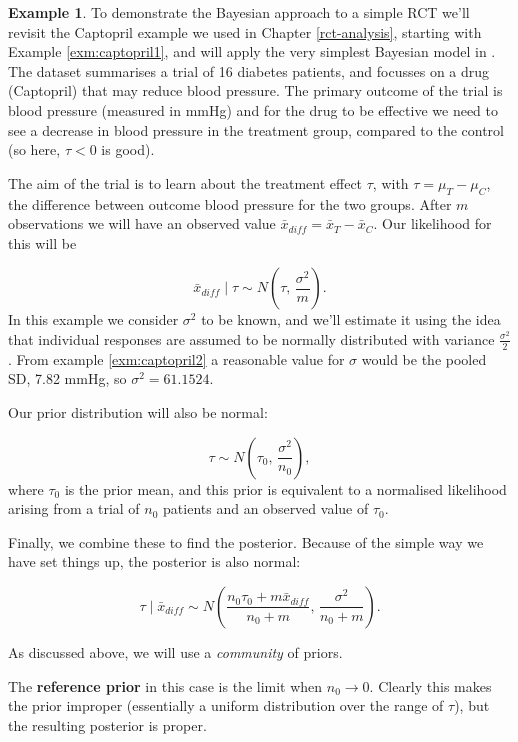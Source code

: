 \documentclass[
  openany]{book}
\theoremstyle{definition}
\theoremstyle{definition}
\newtheorem{example}{Example}[chapter]
\theoremstyle{definition}
\theoremstyle{definition}
\theoremstyle{remark}
\begin{document}
\begin{example}

To demonstrate the Bayesian approach to a simple RCT we'll revisit the Captopril example we used in Chapter \ref{rct-analysis}, starting with Example \ref{exm:captopril1}, and will apply the very simplest Bayesian model in \citet{spiegelhalter1994bayesian}. The dataset summarises a trial of 16 diabetes patients, and focusses on a drug (Captopril) that may reduce blood pressure. The primary outcome of the trial is blood pressure (measured in mmHg) and for the drug to be effective we need to see a decrease in blood pressure in the treatment group, compared to the control (so here, \(\tau<0\) is good).

The aim of the trial is to learn about the treatment effect \(\tau\), with \(\tau = \mu_T - \mu_C\), the difference between outcome blood pressure for the two groups. After \(m\) observations we will have an observed value \(\bar{x}_{diff} = \bar{x}_T - \bar{x}_C\). Our likelihood for this will be

\[ \bar{x}_{diff}\mid{\tau} \sim N\left(\tau,\,\frac{\sigma^2}{m}\right).\]
In this example we consider \(\sigma^2\) to be known, and we'll estimate it using the idea that individual responses are assumed to be normally distributed with variance \(\frac{\sigma^2}{2}\). From example \ref{exm:captopril2} a reasonable value for \(\sigma\) would be the pooled SD, 7.82 mmHg, so \(\sigma^2 = 61.1524\).

Our prior distribution will also be normal:

\[\tau \sim N\left(\tau_0,\,\frac{\sigma^2}{n_0}\right),\]
where \(\tau_0\) is the prior mean, and this prior is equivalent to a normalised likelihood arising from a trial of \(n_0\) patients and an observed value of \(\tau_0\).

Finally, we combine these to find the posterior. Because of the simple way we have set things up, the posterior is also normal:

\begin{equation}
\tau\mid{\bar{x}_{diff}} \sim N\left(\frac{n_0\tau_0 + m\bar{x}_{diff}}{n_0 + m},\,\frac{\sigma^2}{n_0+m}\right).
\label{eq:bayespost}
\end{equation}

As discussed above, we will use a \emph{community} of priors.

The \textbf{reference prior} in this case is the limit when \(n_0 \rightarrow 0\). Clearly this makes the prior improper (essentially a uniform distribution over the range of \(\tau\)), but the resulting posterior is proper.


\end{example}
\end{document}
